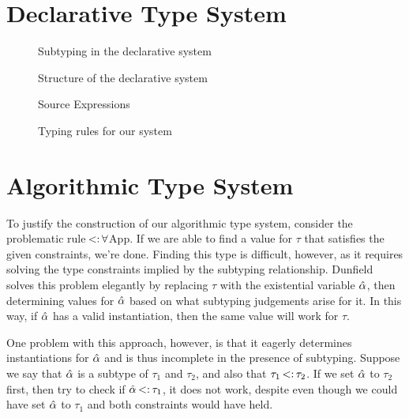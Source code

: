 \documentclass{sig-alternate}
\begin{document}

\section{Declarative Type System}

\begin{figure}

\small
\caption{Subtyping in the declarative system}
\end{figure}
\begin{figure}

\small
\label{fig:declCons}
\caption{Structure of the declarative system}
\end{figure}
\begin{figure}

\small
\label{fig:terms}
\caption{Source Expressions}
\end{figure}
\begin{figure}
\small

\caption{Typing rules for our system}
\end{figure}

\section{Algorithmic Type System}

To justify the construction of our algorithmic type system, consider the problematic rule $\st\forall$App. If we are able to find a value for $\tau$ that satisfies the given constraints, we're done. Finding this type is difficult, however, as it requires solving the type constraints implied by the subtyping relationship. Dunfield solves this problem elegantly by replacing $\tau$ with the existential variable $\hat{\alpha}$, then determining values for $\hat{\alpha}$ based on what subtyping judgements arise for it. In this way, if $\hat{\alpha}$ has a valid instantiation, then the same value will work for $\tau$.

One problem with this approach, however, is that it eagerly determines instantiations for $\hat{\alpha}$ and is thus incomplete in the presence of subtyping. Suppose we say that $\hat{\alpha}$ is a subtype of $\tau_1$ and $\tau_2$, and also that $\tau_1 \st \tau_2$. If we set $\hat{\alpha}$ to $\tau_2$ first, then try to check if $\alphahat \st \tau_1$, it does not work, despite even though we could have set $\hat{\alpha}$ to $\tau_1$ and both constraints would have held.
\end{document}
